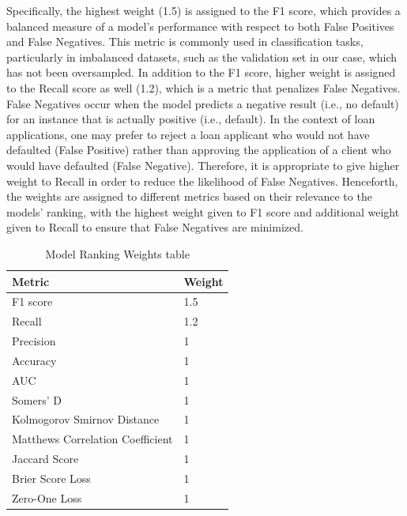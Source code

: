         Specifically, the highest weight (1.5) is assigned to the F1 score, which provides a balanced measure of a model's performance with respect to both False Positives and False Negatives.
        This metric is commonly used in classification tasks, particularly in imbalanced datasets, such as the validation set in our case, which has not been oversampled.
        In addition to the F1 score, higher weight is assigned to the Recall score as well (1.2), which is a metric that penalizes False Negatives.
        False Negatives occur when the model predicts a negative result (i.e., no default) for an instance that is actually positive (i.e., default).
        In the context of loan applications, one may prefer to reject a loan applicant who would not have defaulted (False Positive) rather than approving the application of a client who would have defaulted (False Negative). Therefore, it is appropriate to give higher weight to Recall in order to reduce the likelihood of False Negatives.
        Henceforth, the weights are assigned to different metrics based on their relevance to the models' ranking, with the highest weight given to F1 score and additional weight given to Recall to ensure that False Negatives are minimized.
        
        \begin{table}[H]
            \small
            \setlength{\tabcolsep}{8pt}
            \renewcommand{\arraystretch}{1.3}
            \centering
                \caption[Model Ranking Weights table]{Model Ranking Weights table}\label{tab:weightsrank}
                \begin{tabular}{ll}
            \toprule
            \textbf{Metric} & \textbf{Weight}\\
            \midrule
            \hline
            F1 score & 1.5 \\
            Recall & 1.2 \\
            Precision & 1 \\
            Accuracy & 1 \\
            AUC & 1 \\
            Somers' D & 1 \\ 
            Kolmogorov Smirnov Distance  & 1 \\
            Matthews Correlation Coefficient  & 1 \\
            Jaccard Score  & 1 \\
            Brier Score Loss  & 1 \\
            Zero-One Loss  & 1 \\
            \hline
            \bottomrule
            \end{tabular}
            \vspace{0.7em}
        
            \vspace{-1em}
        \end{table}
        
